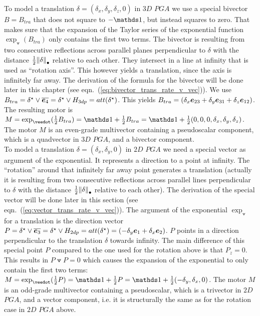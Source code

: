 To model a translation $\delta = (\delta_x, \delta_y, \delta_z, 0)$ in $3D$ $PGA$ we use a
special bivector $B=B_{tra}$ that does not square to $-\ps$, but instead squares to zero.
That makes sure that the expansion of the Taylor series of the exponential function
$\exp_{\veedot}(B_{tra})$ only contains the first two terms. The bivector is resulting
from two consecutive reflections across parallel planes perpendicular to $\delta$ with the
distance $\frac{1}{2}{\left \lVert {\delta} \right \rVert}_\bullet$ relative to each other. They intersect in a line at
infinity that is used as ``rotation axis''. This however yields a translation, since the
axis is infinitely far away. The derivation of the formula for the bivector will be done
later in this chapter (see eqn.~(\ref{eq:bivector_trans_rate_v_vec})). We use $B_{tra} =
{\delta}^\star \vee \overline{\bm{e}_{4}} = {\delta}^\star \vee H_{3dp} =
att({\delta}^\star)$. This yields $B_{tra} = (\delta_x \bm{e}_{23} + \delta_y \bm{e}_{31}
+ \delta_z \bm{e}_{12})$. The resulting motor is $M = \exp_\veedot(\frac{1}{2} B_{tra}) = \ps
+ \frac{1}{2}B_{tra} = \ps + \frac{1}{2}(0, 0, 0, \delta_x, \delta_y, \delta_z)$. The
motor $M$ is an even-grade multivector containing a pseudoscalar component, which is a
quadvector in $3D$ $PGA$, and a bivector component.\\

To model a translation $\delta = (\delta_x, \delta_y, 0)$ in $2D$ $PGA$ we need a special
vector as argument of the exponential. It represents a direction to a point at infinity.
The ``rotation'' around that infinitely far away point generates a translation (actually
it is resulting from two consecutive reflections across parallel lines perpendicular to
$\delta$ with the distance $\frac{1}{2}{\left \lVert {\delta} \right \rVert}_\bullet$ relative to each other). The
derivation of the special vector will be done later in this section (see
eqn.~(\ref{eq:vector_trans_rate_v_vec})). The argument of the exponential $\exp_\veedot$
for a translation is the direction vector $P = {\delta}^\star \vee \overline{\bm{e}_{3}}
= {\delta}^\star \vee H_{2dp} = att({\delta}^\star) = (-\delta_y \bm{e}_{1} +
\delta_x \bm{e}_{2})$. $P$ points in a direction perpendicular to the translation $\delta$
towards infinity. The main difference of this special point $P$ compared to the one used
for the rotation above is that $P_z = 0$. This results in $P \veedot P = 0$ which causes
the expansion of the exponential to only contain the first two terms: $M =
\exp_\veedot(\frac{1}{2} P) = \ps + \frac{1}{2}P = \ps +
\frac{1}{2}(-\delta_y,\delta_x,0)$. The motor $M$ is an odd-grade multivector containing a
pseudoscalar, which is a trivector in $2D$ $PGA$, and a vector component, i.e. it is
structurally the same as for the rotation case in $2D$ $PGA$ above.\\

